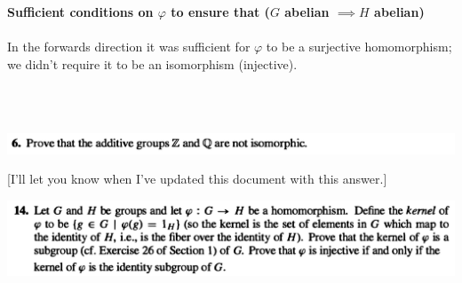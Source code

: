 {\bf Sufficient conditions on $\varphi$ to ensure that ($G$ abelian $\implies H$ abelian)\\}\\
In the forwards direction it was sufficient for $\varphi$ to be a surjective homomorphism; we didn't
require it to be an isomorphism (injective).

~\\~\\
\begin{mdframed}
\includegraphics[width=400pt]{img/abstract-algebra--nf--3-89f3.png}
\end{mdframed}

[I'll let you know when I've updated this document with this answer.]

\begin{mdframed}
\newpage
\includegraphics[width=400pt]{img/abstract-algebra--nf--3-b601.png}
\end{mdframed}


